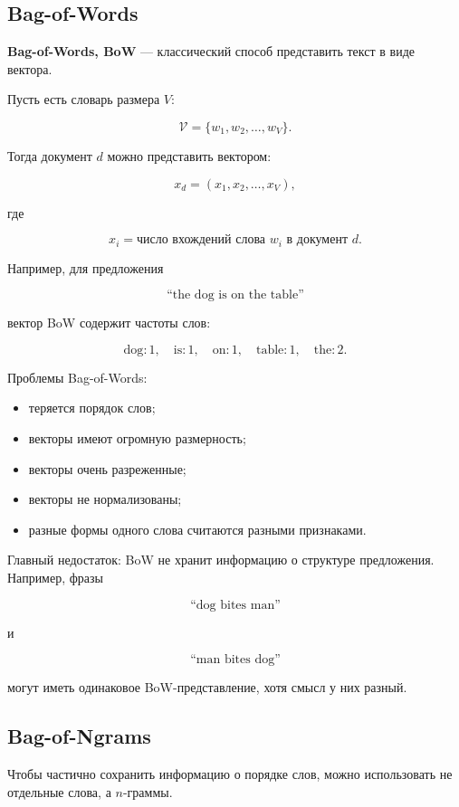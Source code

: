 \documentclass[a4paper,12pt]{article}
\begin{document}
\subsection{Bag-of-Words}

\textbf{Bag-of-Words, BoW} --- классический способ представить текст в виде вектора.

Пусть есть словарь размера \(V\):

\[
\mathcal{V} = \{w_1, w_2, \dots, w_V\}.
\]

Тогда документ \(d\) можно представить вектором:

\[
x_d = (x_1, x_2, \dots, x_V),
\]

где

\[
x_i = \text{число вхождений слова } w_i \text{ в документ } d.
\]

Например, для предложения

\[
\text{``the dog is on the table''}
\]

вектор BoW содержит частоты слов:

\[
\text{dog}: 1, \quad
\text{is}: 1, \quad
\text{on}: 1, \quad
\text{table}: 1, \quad
\text{the}: 2.
\]

Проблемы Bag-of-Words:

\begin{itemize}
    \item теряется порядок слов;
    \item векторы имеют огромную размерность;
    \item векторы очень разреженные;
    \item векторы не нормализованы;
    \item разные формы одного слова считаются разными признаками.
\end{itemize}

Главный недостаток: BoW не хранит информацию о структуре предложения. Например, фразы

\[
\text{``dog bites man''}
\]

и

\[
\text{``man bites dog''}
\]

могут иметь одинаковое BoW-представление, хотя смысл у них разный.

\subsection{Bag-of-Ngrams}

Чтобы частично сохранить информацию о порядке слов, можно использовать не отдельные слова, а \(n\)-граммы.
\end{document}
